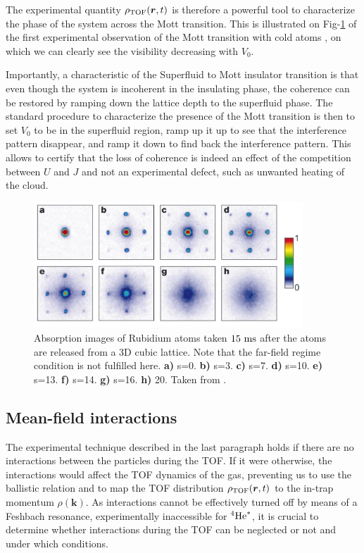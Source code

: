 The experimental quantity $\rho_{\rm{TOF}}(\bm{r},t)$ is therefore a powerful tool to characterize the phase of the system across the Mott transition. This is illustrated on Fig-\ref{fig:mott_greiner} of the first experimental observation of the Mott transition with cold atoms \cite{greiner2002quantum}, on which we can clearly see the visibility decreasing with $V_0$.

Importantly, a characteristic of the Superfluid to Mott insulator transition is that even though the system is incoherent in the insulating phase, the coherence can be restored by ramping down the lattice depth to the superfluid phase. The standard procedure to characterize the presence of the Mott transition is then to set $V_0$ to be in the superfluid region, ramp up it up to see that the interference pattern disappear, and ramp it down to find back the interference pattern. This allows to certify that the loss of coherence is indeed an effect of the competition between $U$ and $J$ and not an experimental defect, such as unwanted heating of the cloud. 

\begin{figure}
    \centering
    \includegraphics[width=0.9\textwidth]{Fig/Chapter2/mott_greiner.png}
    \caption{Absorption images of Rubidium atoms taken $15 \ \rm{ms}$ after the atoms are released from a 3D cubic lattice. Note that the far-field regime condition is not fulfilled here. \textbf{a)} s=0. \textbf{b)} s=3. \textbf{c)} s=7. \textbf{d)} s=10. \textbf{e)} s=13. \textbf{f)} s=14. \textbf{g)} s=16. \textbf{h)} 20. Taken from \cite{greiner2002quantum}.}
    \label{fig:mott_greiner}
\end{figure}


\subsection{Mean-field interactions}

The experimental technique described in the last paragraph holds if there are no interactions between the particles during the TOF. If it were otherwise, the interactions would affect the TOF dynamics of the gas, preventing us to use the ballistic relation and to map the TOF distribution $\rho_{\rm{TOF}}(\bm{r},t)$ to the in-trap momentum $\rho(\bm{k})$. As interactions cannot be effectively turned off by means of a Feshbach resonance, experimentally inaccessible for $^4 \mathrm{He}^*$, it is crucial to determine whether interactions during the TOF can be neglected or not and under which conditions.

